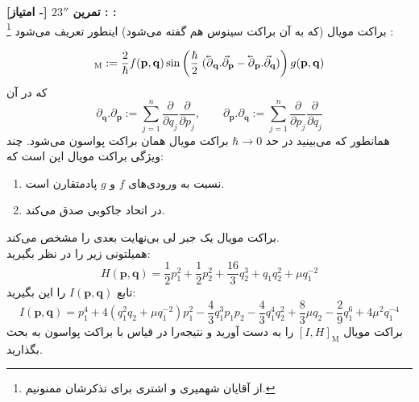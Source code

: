 \documentclass{article}
\newenvironment{exercise}[3][\unskip]{%
	\par
	\noindent
	\textbf{تمرین
		#1
		[- امتیاز] 
		\def\temp{#3}\ifx\temp\empty
		: 
		\else
		: #3 \vspace{0.5em} \\ \noindent
		\fi
}}{}
\begin{document}
	
	
	\begin{exercise}[$23''$]{20}{}
		\newcommand{\cev}[1]{\reflectbox{\ensuremath{\vec{\reflectbox{\ensuremath{#1}}}}}}
		براکت مویال 
		(که به آن براکت سینوس هم گفته می‌شود)
		 اینطور تعریف می‌شود
		\footnote{از آقایان شهمیری و اشتری برای تذکرشان ممنونیم.}
		: 
		
		\begin{equation*}
			[f(\mathbf{p},\mathbf{q}),g(\mathbf{p},\mathbf{q})]_{\text{M}}:=
			 \frac{2}{\hbar}f(\mathbf{p},\mathbf{q})
			\sin \left( \frac{\hbar}{2}\;(
			\cev{\partial}_{\mathbf{q}}.\vec{\partial}_{\mathbf{p}}
			-\cev{\partial}_{\mathbf{p}}.\vec{\partial}_{\mathbf{q}})
			\right)
			g(\mathbf{p},\mathbf{q})
		\end{equation*}
		که در آن 
		\begin{equation*}
			\partial_{\mathbf{q}}.\partial_{\mathbf{p}} :=
			\sum^n_{j=1} \frac{\partial}{\partial q_j}\frac{\partial}{\partial p_j}, 
			\quad \quad
			\partial_{\mathbf{p}}.\partial_{\mathbf{q}} :=
			\sum^n_{j=1} \frac{\partial}{\partial p_j}\frac{\partial}{\partial q_j}
		\end{equation*}
		همانطور که می‌بینید در حد 
		$\hbar \to 0$ 
		براکت مویال همان براکت پواسون می‌شود. چند ویژگی براکت مویال این است که:
		\begin{enumerate}
			\item
			نسبت به ورودی‌های 
			$f$ 
			و 
			$g$ 
			پادمتقارن است. 
			\item 
			در اتحاد جاکوبی صدق می‌کند.
		\end{enumerate}
		براکت مویال یک جبر لی بی‌نهایت بعدی را مشخص می‌کند. 
		\\
		همیلتونی زیر را در نظر بگیرید:
		\begin{equation*}
			H(\mathbf{p},\mathbf{q}) = \frac{1}{2}p_1^2+\frac{1}{2}p_2^2
			+\frac{16}{3}q_2^3+q_1 q_2^2 + \mu q_1^{-2}
		\end{equation*}
		تابع 
		$I(\mathbf{p},\mathbf{q})$ 
		را این بگیرید:
		\begin{equation*}
			I(\mathbf{p},\mathbf{q}) =p_1^4+
			4(q_1^2 q_2 + \mu q_1^{-2})p_1^2 
			-\frac{4}{3}q_1^3 p_1 p_2
			-\frac{4}{3}q_1^4 q_2^2 
			+\frac{8}{3}\mu q_2
			-\frac{2}{9}q_1^6
			+4 \mu^2 q_1^{-4}
		\end{equation*}
		براکت مویال 
		$[I,H]_{\text{M}}$ 
		را به دست آورید و نتیجه‌را در قیاس با براکت پواسون به بحث بگذارید.
	\end{exercise}
	
\end{document}
